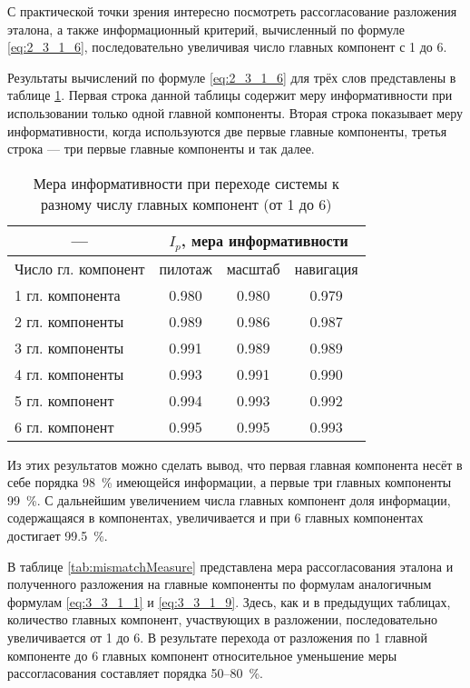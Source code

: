 С практической точки зрения интересно посмотреть рассогласование разложения эталона, а также информационный критерий, вычисленный по формуле \eqref{eq:2_3_1_6}, последовательно увеличивая число главных компонент с 1 до 6.

Результаты вычислений по формуле \eqref{eq:2_3_1_6} для трёх слов представлены в таблице \ref{tab:informationMeasureDependence}.
Первая строка данной таблицы содержит меру информативности при использовании только одной главной компоненты.
Вторая строка показывает меру информативности, когда используются две первые главные компоненты, третья строка --- три первые главные компоненты и так далее.

\begin{table}[h]
	\centering
	\caption{Мера информативности при переходе системы к разному числу главных компонент (от 1 до 6)}
	\label{tab:informationMeasureDependence}
	\begin{tabular}{|l | c | c | c |}
		\hline
		\multicolumn{1}{|c|}{---} & \multicolumn{3}{c|}{$I_p$, мера информативности} \\
		\hline
		Число гл. компонент\phantom{000} & \phantom{000}пилотаж\phantom{000} & \phantom{000}масштаб\phantom{000} & \phantom{000}навигация\phantom{000} \\
		\hline
		1 гл. компонента	& 0.980	& 0.980	& 0.979	\\
		2 гл. компоненты	& 0.989	& 0.986	& 0.987	\\
		3 гл. компоненты	& 0.991	& 0.989	& 0.989	\\
		4 гл. компоненты	& 0.993	& 0.991	& 0.990	\\
		5 гл. компонент		& 0.994	& 0.993	& 0.992	\\
		6 гл. компонент		& 0.995	& 0.995	& 0.993	\\
		\hline
	\end{tabular}
\end{table}

Из этих результатов можно сделать вывод, что первая главная компонента несёт в себе порядка 98~\% имеющейся информации, а первые три главных компоненты 99~\%.
С дальнейшим увеличением числа главных компонент доля информации, содержащаяся в компонентах, увеличивается и при 6 главных компонентах достигает 99.5~\%.

В таблице \ref{tab:mismatchMeasure} представлена мера рассогласования эталона и полученного разложения на главные компоненты по формулам аналогичным формулам \eqref{eq:3_3_1_1} и \eqref{eq:3_3_1_9}.
Здесь, как и в предыдущих таблицах, количество главных компонент, участвующих в разложении, последовательно увеличивается от 1 до 6.
В результате перехода от разложения по 1 главной компоненте до 6 главных компонент относительное уменьшение меры рассогласования составляет порядка 50--80~\%.

